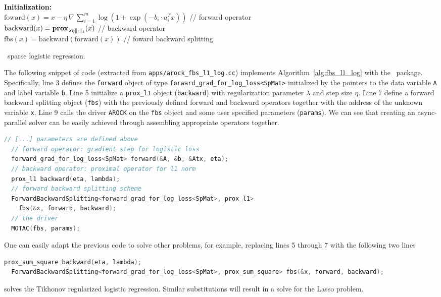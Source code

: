 \begin{algorithm}[H]\label{alg:fbs_l1_log}
  \textbf{Initialization:} \\
  \quad $\text{foward}(x) = x - \eta \, \nabla \,\sum_{i = 1}^m \log (1 + \exp(-b_i \cdot a_i^T x))$ // forward operator \\
  \quad $\text{backward}(x) = \mathbf{prox}_{\lambda \eta \|\cdot\|_1} (x)$ \hspace{32mm} // backward operator\\
  \quad $\text{fbs}(x) = \text{backward}(\text{forward}(x))$  \hspace{29mm} // foward backward splitting \\
  \caption{\pkg~sparse logistic regression.}
\end{algorithm}
The following snippet of code (extracted from 
\texttt{apps/arock\_fbs\_l1\_log.cc}) implements Algorithm~\ref{alg:fbs_l1_log} with the \pkg~package. 
Specifically, line 3 defines the \texttt{forward} object of type \texttt{forward\_grad\_for\_log\_loss<SpMat>} 
initialized by the pointers to the data variable \texttt{A} and label variable \texttt{b}. Line 5  initialize a 
\texttt{prox\_l1} object (\texttt{backward}) with regularization parameter $\lambda$ and step size $\eta$. 
Line 7 define a forward backward splitting object (\texttt{fbs}) with the previously defined forward and 
backward operators together with the address of the unknown variable \texttt{x}. Line 9 calls the driver 
\texttt{AROCK} on the \texttt{fbs} object and some user specified parameters (\texttt{params}). We can see
that creating an async-parallel solver can be easily achieved through assembling appropriate operators together.  
\begin{lstlisting}[language=C++, label={fbs_l1_log_code}]
  // [...] parameters are defined above
  // forward operator: gradient step for logistic loss
  forward_grad_for_log_loss<SpMat> forward(&A, &b, &Atx, eta);
  // backward operator: proximal operator for l1 norm 
  prox_l1 backward(eta, lambda);
  // forward backward splitting scheme
  ForwardBackwardSplitting<forward_grad_for_log_loss<SpMat>, prox_l1>
    fbs(&x, forward, backward);  
  // the driver
  MOTAC(fbs, params);  
\end{lstlisting}
One can easily adapt the previous code to solve other problems, for example, replacing lines 5 through 7 with
the following two lines
\begin{lstlisting}[language=C++, label = {fbs_modified_code}]
  prox_sum_square backward(eta, lambda);
  ForwardBackwardSplitting<forward_grad_for_log_loss<SpMat>, prox_sum_square> fbs(&x, forward, backward);    
\end{lstlisting}
solves the Tikhonov regularized logistic regression. Similar substitutions will result in a solve for the Lasso problem.
